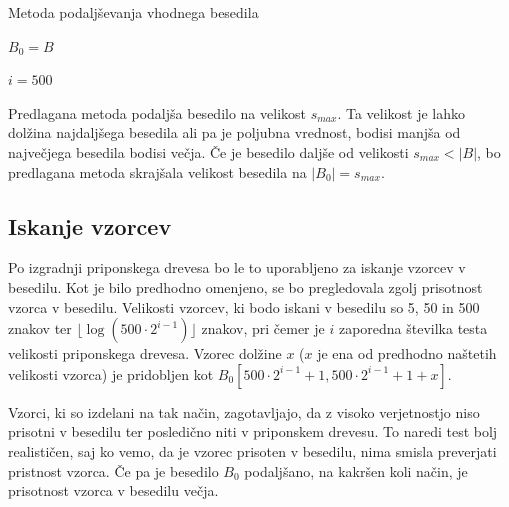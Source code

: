 \begin{algorithm}[htb]

\caption{Metoda podaljševanja vhodnega besedila}\label{alg:Konkatenacija}
{
    {$B_0=B$}

    {$i=500$}
    
    
}
\end{algorithm}

Predlagana metoda podaljša besedilo na velikost $s_{max}$. Ta velikost je lahko dolžina najdaljšega besedila ali pa je poljubna vrednost, bodisi manjša od največjega besedila bodisi večja. Če je besedilo daljše od velikosti $s_{max}<|B|$, bo predlagana metoda skrajšala velikost besedila na $|B_0|=s_{max}$.

\subsection{Iskanje vzorcev}

Po izgradnji priponskega drevesa bo le to uporabljeno za iskanje vzorcev v besedilu. Kot je bilo predhodno omenjeno, se bo pregledovala zgolj prisotnost vzorca v besedilu. Velikosti vzorcev, ki bodo iskani v besedilu so 5, 50 in 500 znakov ter $\lfloor\log{(500\cdot2^{i-1})}\rfloor$ znakov, pri čemer je $i$ zaporedna številka testa velikosti priponskega drevesa. Vzorec dolžine $x$ ($x$ je ena od predhodno naštetih velikosti vzorca) je pridobljen kot $B_0[500\cdot2^{i-1}+1,500\cdot2^{i-1}+1+x]$. 

Vzorci, ki so izdelani na tak način, zagotavljajo, da z visoko verjetnostjo niso prisotni v besedilu ter posledično niti v priponskem drevesu. To naredi test bolj realističen, saj ko vemo, da je vzorec prisoten v besedilu, nima smisla preverjati pristnost vzorca. Če pa je besedilo $B_0$ podaljšano, na kakršen koli način, je prisotnost vzorca v besedilu večja.